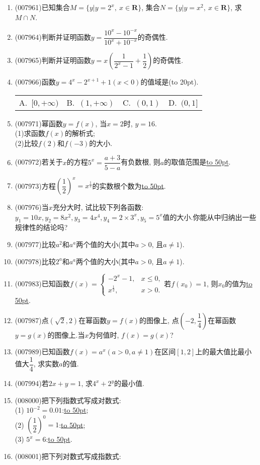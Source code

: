 \documentclass[10pt,a4paper]{article}
\newcommand{\blank}[1]{\underline{\hbox to #1pt{}}}
\newcommand{\bracket}[1]{(\hbox to #1pt{})}
\newcommand{\fourch}[4]{\par\begin{tabular}{p{.23\textwidth}p{.23\textwidth}p{.23\textwidth}p{.23\textwidth}}
A.~#1 &B.~#2& C.~#3& D.~#4
\end{tabular}}
\begin{document}
\begin{enumerate}[1.]
\fourch{$m\ge 1$}{$m<1$}{$m>-1$}{$m\le -1$}
\item {\tiny (007961)}已知集合$M=\{y|y=2^x,\ x\in \mathbf{R}\}$, 集合$N=\{y|y=x^2,\ x\in \mathbf{R}\}$, 求$M\cap N$.
\item {\tiny (007964)}判断并证明函数$y=\dfrac{10^x-10^{-x}}{10^x+10^{-x}}$的奇偶性.
\item {\tiny (007965)}判断并证明函数$y=x(\dfrac 1{2^x-1}+\dfrac 12)$的奇偶性.
\item {\tiny (007966)}函数$y=4^x-2^{x+1}+1(x<0)$的值域是\bracket{20}.
\fourch{$[0,+\infty)$}{$(1,+\infty)$}{$(0,1)$}{$(0,1]$}
\item {\tiny (007971)}幂函数$y=f(x)$, 当$x=2$时, $y=16$.\\
(1)求函数$f(x)$的解析式;\\
(2)比较$f(2)$和$f(-3)$的大小.
\item {\tiny (007972)}若关于$x$的方程$5^x=\dfrac{a+3}{5-a}$有负数根, 则$a$的取值范围是\blank{50}.
\item {\tiny (007973)}方程$(\dfrac 12)^x=x^{\frac 12}$的实数根个数为\blank{50}.
\item {\tiny (007976)}当$x$充分大时, 试比较下列各函数: $y_1=10x,y_2=8x^2,y_3=4x^4,y_4=2\times 3^x,y_5=5^x$值的大小.你能从中归纳出一些规律性的结论吗?
\item {\tiny (007977)}比较$a^2$和$a^a$两个值的大小(其中$a>0$, 且$a\ne 1$).
\item {\tiny (007978)}比较$2^a$和$a^a$两个值的大小(其中$a>0$, 且$a\ne 1$).
\item {\tiny (007983)}已知函数$f(x)=\begin{cases} -2^x-1, & x\le 0, \\x^{\frac 12}, & x>0. \end{cases}$若$f(x_0)=1$, 则$x_0$的值为\blank{50}.
\item {\tiny (007987)}点$(\sqrt 2,2)$在幂函数$y=f(x)$的图像上, 点$(-2,\dfrac 14)$在幂函数$y=g(x)$的图像上.当$x$为何值时, $f(x)=g(x)$?
\item {\tiny (007989)}已知函数$f(x)=a^x(a>0,a\ne 1)$在区间$[1,2]$上的最大值比最小值大$\dfrac 14$, 求实数$a$的值.
\item {\tiny (007994)}若$2x+y=1$, 求$4^x+2^y$的最小值.
\item {\tiny (008000)}把下列指数式写成对数式:\\
(1) $10^{-2}=0.01$:\blank{50};\\
(2) $(\dfrac 12)^0=1$:\blank{50};\\
(3) $5^x=6$:\blank{50}.
\item {\tiny (008001)}把下列对数式写成指数式:\\

\end{enumerate}
\end{document}
